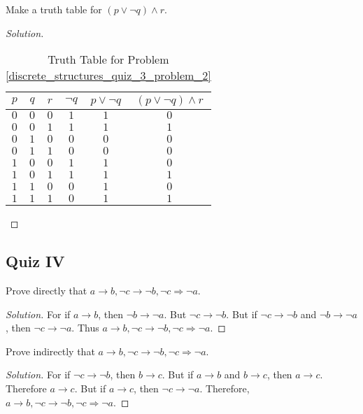\documentclass[../main.tex]{subfiles}
\begin{document}
\begin{problem}
\label{discrete_structures_quiz_3_problem_2}
Make a truth table for $(p\lor \neg q)\land r$.
\end{problem}
\begin{proof}[Solution]
\
\begin{table}[H]
    \centering
    \begin{tabular}{c c c c c c}
        \hline
        $p$ & $q$ & $r$ & $\neg q$ & $p\lor \neg q$ & $(p\lor \neg q)\land r$ \\ [0.5ex]
        \hline
        $0$ & $0$ & $0$ & $1$ & $1$ & $0$\\
        $0$ & $0$ & $1$ & $1$ & $1$ & $1$\\
        $0$ & $1$ & $0$ & $0$ & $0$ & $0$\\
        $0$ & $1$ & $1$ & $0$ & $0$ & $0$\\
        $1$ & $0$ & $0$ & $1$ & $1$ & $0$\\
        $1$ & $0$ & $1$ & $1$ & $1$ & $1$\\
        $1$ & $1$ & $0$ & $0$ & $1$ & $0$\\
        $1$ & $1$ & $1$ & $0$ & $1$ & $1$\\
        \hline
    \end{tabular}
    \caption{Truth Table for Problem \ref{discrete_structures_quiz_3_problem_2}}
    \label{tab:discrete_structures_final_exam_problem}
\end{table}
\end{proof}
%
\subsection{Quiz IV}
%
\begin{problem}
Prove directly that $a\rightarrow b, \neg c\rightarrow \neg b, \neg c \Rightarrow \neg a$.
\end{problem}
\begin{proof}[Solution]
For if $a\rightarrow b$, then $\neg b \rightarrow \neg a$. But $\neg c \rightarrow \neg b$. But if $\neg c \rightarrow \neg b$ and $\neg b \rightarrow \neg a$, then $\neg c \rightarrow \neg a$. Thus $a\rightarrow b, \neg c \rightarrow \neg b, \neg c \Rightarrow \neg a$.
\end{proof}

\begin{problem}
Prove indirectly that $a\rightarrow b, \neg c \rightarrow \neg b, \neg c \Rightarrow \neg a$.
\end{problem}
\begin{proof}[Solution]
For if $\neg c \rightarrow \neg b$, then $b\rightarrow c$. But if $a\rightarrow b$ and $b\rightarrow c$, then $a\rightarrow c$. Therefore $a\rightarrow c$. But if $a\rightarrow c$, then $\neg c \rightarrow \neg a$. Therefore, $a\rightarrow b, \neg c \rightarrow \neg b, \neg c \Rightarrow \neg a$.
\end{proof}
\end{document}
